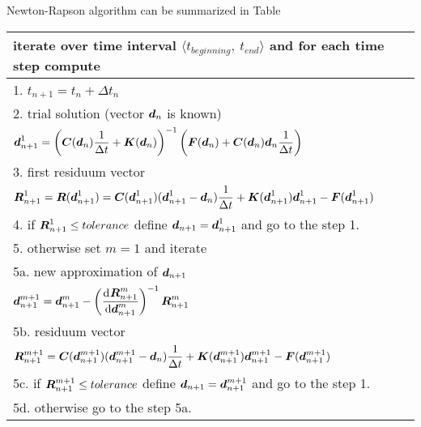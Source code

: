 \documentclass[12pt]{book}
\newcommand{\mbf}[1]{\mbox{\boldmath$#1$}}
\newcommand{\del}[2]{\mbox{$\displaystyle\frac{#1}{#2}$}}
\newcommand{\od}[2]{\del{{\rm d}\>\!{#1}}{{\rm d}{#2}}}
\begin{document}
Newton-Rapson algorithm can be summarized in Table
\begin{center}
\begin{tabular}{|l|}
\hline
iterate over time interval $\langle t_{beginning},\ t_{end}\rangle$
and for each time step compute
\\ \hline
\hspace{10mm} 1. $t_{n+1}=t_{n}+\Delta t_{n}$
\\[3mm]
\hspace{10mm} 2. trial solution (vector $\mbf{d}_{n}$ is known)
\\
\hspace{10mm} $\mbf{d}_{n+1}^{1} = \left(\mbf{C}(\mbf{d}_{n}) \del{1}{\Delta t} + \mbf{K}(\mbf{d}_{n})\right)^{-1} 
\left(\mbf{F}(\mbf{d}_{n}) + \mbf{C}(\mbf{d}_{n})\mbf{d}_{n}\del{1}{\Delta t}\right)$
\\[3mm]
\hspace{10mm} 3. first residuum vector
\\
\hspace{10mm} $\mbf{R}_{n+1}^{1} = \mbf{R}(\mbf{d}_{n+1}^{1}) =
\mbf{C}(\mbf{d}_{n+1}^{1}) (\mbf{d}_{n+1}^{1} - \mbf{d}_{n})\del{1}{\Delta t} +
\mbf{K}(\mbf{d}_{n+1}^{1}) \mbf{d}_{n+1}^{1} - \mbf{F}(\mbf{d}_{n+1}^{1})$
\\[3mm]
\hspace{10mm} 4. if $\mbf{R}_{n+1}^{1} \leq tolerance$ define $\mbf{d}_{n+1} = \mbf{d}_{n+1}^{1}$ and go to the step 1.
\\[3mm]
\hspace{10mm} 5. otherwise set $m=1$ and iterate
\\[3mm]
\hspace{20mm} 5a. new approximation of $\mbf{d}_{n+1}$
\\
\hspace{20mm} $\mbf{d}_{n+1}^{m+1} = \mbf{d}_{n+1}^{m} - \left(\od{\mbf{R}_{n+1}^{m}}{\mbf{d}_{n+1}^{m}}\right)^{-1}
\mbf{R}_{n+1}^{m}$
\\[3mm]
\hspace{20mm} 5b. residuum vector
\\
\hspace{20mm} $\mbf{R}_{n+1}^{m+1} = \mbf{C}(\mbf{d}_{n+1}^{m+1}) (\mbf{d}_{n+1}^{m+1} - \mbf{d}_{n})\del{1}{\Delta t} +
\mbf{K}(\mbf{d}_{n+1}^{m+1}) \mbf{d}_{n+1}^{m+1} - \mbf{F}(\mbf{d}_{n+1}^{m+1})$
\\[3mm]
\hspace{20mm} 5c. if $\mbf{R}_{n+1}^{m+1} \leq tolerance$ define $\mbf{d}_{n+1} = \mbf{d}_{n+1}^{m+1}$ and go to the step 1.
\\[3mm]
\hspace{20mm} 5d. otherwise go to the step 5a.
\\ \hline
\end{tabular}
\end{center}
\end{document}
